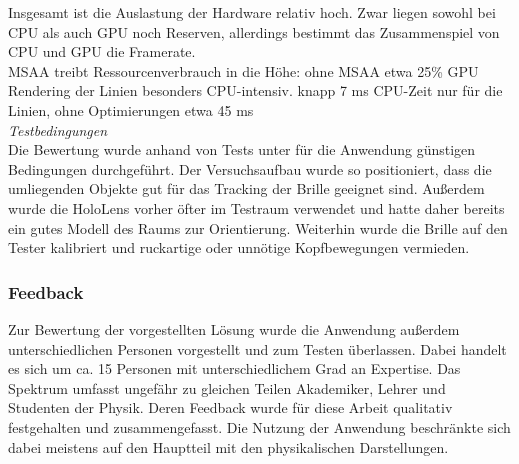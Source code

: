 Insgesamt ist die Auslastung der Hardware relativ hoch. Zwar liegen sowohl bei CPU als auch GPU noch Reserven, allerdings bestimmt das Zusammenspiel von CPU und GPU die Framerate.\\

MSAA treibt Ressourcenverbrauch in die Höhe: ohne MSAA etwa 25\% GPU\\
Rendering der Linien besonders CPU-intensiv. knapp 7 ms CPU-Zeit nur für die Linien, ohne Optimierungen etwa 45 ms\\

\textit{Testbedingungen}\\
Die Bewertung wurde anhand von Tests unter für die Anwendung günstigen Bedingungen durchgeführt. Der Versuchsaufbau wurde so positioniert, dass die umliegenden Objekte gut für das Tracking der Brille geeignet sind. Außerdem wurde die HoloLens vorher öfter im Testraum verwendet und hatte daher bereits ein gutes Modell des Raums zur Orientierung. Weiterhin wurde die Brille auf den Tester kalibriert und ruckartige oder unnötige Kopfbewegungen vermieden. 

\subsubsection{Feedback}
Zur Bewertung der vorgestellten Lösung wurde die Anwendung außerdem unterschiedlichen Personen vorgestellt und zum Testen überlassen. Dabei handelt es sich um ca. 15 Personen mit unterschiedlichem Grad an Expertise. Das Spektrum umfasst ungefähr zu gleichen Teilen Akademiker, Lehrer und Studenten der Physik. Deren Feedback wurde für diese Arbeit qualitativ festgehalten und zusammengefasst. Die Nutzung der Anwendung beschränkte sich dabei meistens auf den Hauptteil mit den physikalischen Darstellungen.\\


